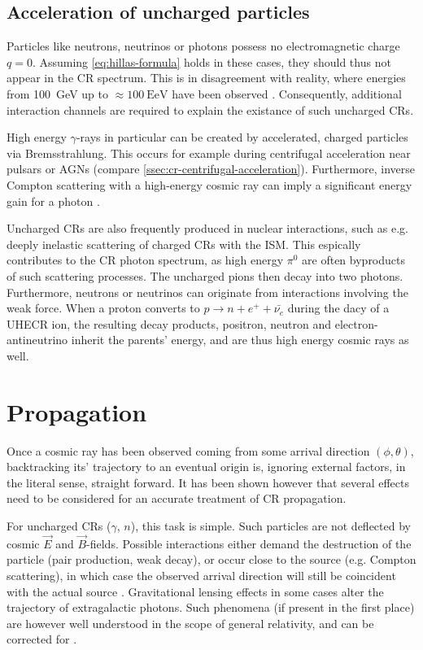 \subsection{Acceleration of uncharged particles}
\label{ssec:cr-uncharged-acceleration}

Particles like neutrons, neutrinos or photons possess no electromagnetic charge $q = 0$. Assuming \autoref{eq:hillas-formula} holds in these cases, they 
should thus not appear in the CR spectrum. This is in disagreement with reality, where energies from \SI{100}{\giga\electronvolt} up to 
$\approx\SI{100}{\exa\electronvolt}$ have been observed \cite{abeysekara2018very, ishihara2016extremely}. Consequently, additional interaction channels are 
required to explain the existance of such uncharged CRs.

High energy $\gamma$-rays in particular can be created by accelerated, charged particles via Bremsstrahlung. This occurs for example during centrifugal 
acceleration near pulsars or AGNs (compare \autoref{ssec:cr-centrifugal-acceleration}). Furthermore, inverse Compton scattering with a high-energy cosmic ray can 
imply a significant energy gain for a photon \cite{jones1965inverse}.

Uncharged CRs are also frequently produced in nuclear interactions, such as e.g. deeply inelastic scattering of charged CRs with the ISM. This espically 
contributes to the CR photon spectrum, as high energy $\pi^0$ are often byproducts of such scattering processes. The uncharged pions then decay into two photons. 
Furthermore, neutrons or neutrinos can originate from interactions involving the weak force. When a proton converts to $p\rightarrow n+e^++\bar{\nu_e}$ during the 
dacy of a UHECR ion, the resulting decay products, positron, neutron and electron-antineutrino inherit the parents' energy, and are thus high energy cosmic rays as 
well.

\section{Propagation}
\label{sec:cr-propagation}

Once a cosmic ray has been observed coming from some arrival direction $(\phi, \theta)$, backtracking its' trajectory to an eventual origin is, ignoring external 
factors, in the literal sense, straight forward. It has been shown however that several effects need to be considered for an accurate treatment of CR propagation. 

For uncharged CRs ($\gamma$, $n$), this task is simple. Such particles are not deflected by cosmic $\vec{E}$ and $\vec{B}$-fields. Possible interactions either 
demand the destruction of the particle (pair production, weak decay), or occur close to the source (e.g. Compton scattering), in which case the observed arrival 
direction will still be coincident with the actual source \cite{fermi201398}. Gravitational lensing effects in some cases alter the trajectory of extragalactic 
photons. Such phenomena (if present in the first place) are however well understood in the scope of general relativity, and can be corrected for 
\cite{bartelmann2010gravitational, bartelmann2001weak}.

